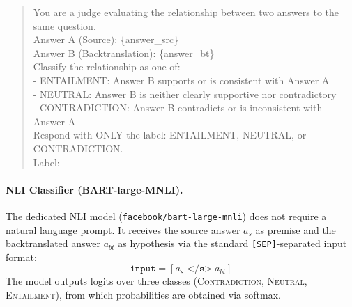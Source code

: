 \begin{quote}
\small\ttfamily
You are a judge evaluating the relationship between two answers to the same question.\\[4pt]
Answer A (Source): \{answer\_src\}\\
Answer B (Backtranslation): \{answer\_bt\}\\[4pt]
Classify the relationship as one of:\\
- ENTAILMENT: Answer B supports or is consistent with Answer A\\
- NEUTRAL: Answer B is neither clearly supportive nor contradictory\\
- CONTRADICTION: Answer B contradicts or is inconsistent with Answer A\\[4pt]
Respond with ONLY the label: ENTAILMENT, NEUTRAL, or CONTRADICTION.\\
Label:
\end{quote}

\paragraph{NLI Classifier (BART-large-MNLI).}
The dedicated NLI model (\texttt{facebook/bart-large-mnli}) does not require a natural language prompt. It receives the source answer $a_s$ as premise and the backtranslated answer $a_{bt}$ as hypothesis via the standard \texttt{[SEP]}-separated input format:
\begin{equation}
    \texttt{input} = [a_s \;\texttt{</s>}\; a_{bt}]
\end{equation}
The model outputs logits over three classes (\textsc{Contradiction}, \textsc{Neutral}, \textsc{Entailment}), from which probabilities are obtained via softmax.
